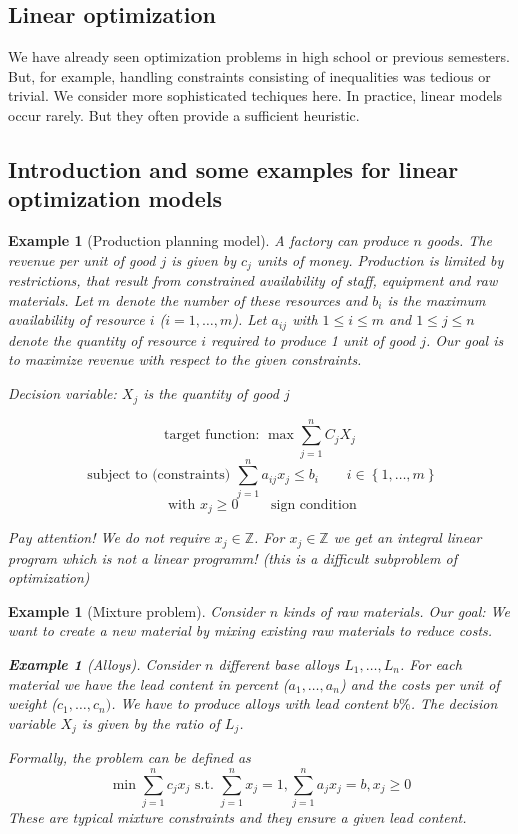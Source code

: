 \documentclass{article}
\numberwithin{lecref}{section}
\newcounter{exercises}
\newtheorem{example}[exercises]{Example}
\newtheorem*{Example}{Example}
\newcommand{\Set}[1]{\left\{#1\right\}}
\begin{document}
\subsection{Linear optimization}

We have already seen optimization problems in high school or previous semesters.
But, for example, handling constraints consisting of inequalities was tedious or trivial.
We consider more sophisticated techiques here.
In practice, linear models occur rarely. But they often provide a sufficient heuristic.

\subsection{Introduction and some examples for linear optimization models}

\begin{example}[Production planning model]
	\label{example:1}
	A factory can produce $n$ goods.
	The revenue per unit of good $j$ is given by $c_j$ units of money.
	Production is limited by restrictions, that result from constrained availability of staff, equipment and raw materials.
	Let $m$ denote the number of these resources and $b_i$ is the maximum availability of resource $i$ ($i = 1, \dots, m$).
	Let $a_{ij}$ with $1 \leq i \leq m$ and $1 \leq j \leq n$ denote the quantity of resource $i$ required to produce 1 unit of good $j$.
	Our goal is to maximize revenue with respect to the given constraints.

	\emph{Decision variable:} $X_j$ is the quantity of good $j$

	\[ \text{target function: } \max \sum_{j=1}^n C_j X_j \]
	\[ \text{ subject to (constraints) } \sum_{j=1}^n a_{ij} x_j \leq b_i \qquad i \in \Set{1, \dots, m} \]
	\[ \text{ with } x_j \geq 0 \qquad \text{ sign condition} \]

	Pay attention! We do not require $x_j \in \mathbb Z$. For $x_j \in \mathbb Z$ we get an integral linear program which is \emph{not} a linear programm! (this is a difficult subproblem of optimization)
\end{example}

\begin{example}[Mixture problem]
	\label{example:2}
	Consider $n$ kinds of raw materials. Our goal: We want to create a new material by mixing existing raw materials to reduce costs.

	\begin{Example}[Alloys]
		Consider $n$ different base alloys $L_1, \dots, L_n$.
		For each material we have the lead content in percent ($a_1, \dots, a_n$) and the costs per unit of weight ($c_1, \dots, c_n)$.
		We have to produce alloys with lead content $b \%$.
		The decision variable $X_j$ is given by the ratio of $L_j$.

		Formally, the problem can be defined as
		\[ \min{\sum_{j=1}^n c_j x_j} \text{ s.t. } \sum_{j=1}^n x_j = 1, \sum_{j=1}^n a_j x_j = b, x_j \geq 0 \]
		These are typical mixture constraints and they ensure a given lead content.
	\end{Example}
\end{example}
\end{document}
